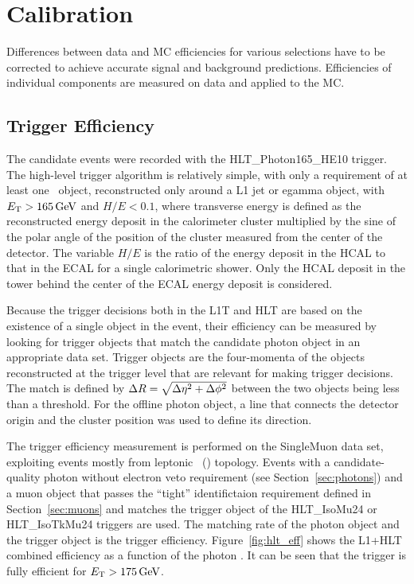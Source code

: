 \chapter{Calibration}
\label{chap:calibration}

Differences between data and MC efficiencies for various selections have to be corrected to achieve accurate signal and background predictions. 
Efficiencies of individual components are measured on data and applied to the MC.

\section{Trigger Efficiency}
\label{sec:triggereff}



The candidate events were recorded with the HLT\_Photon165\_HE10 trigger.
The high-level trigger algorithm is relatively simple, with only a requirement of at least one \egamma\ object, reconstructed only around a L1 jet or egamma object, with $E_{\mathrm{T}} > 165\,\text{Ge\hspace{-.08em}V}$ and $H/E < 0.1$, where transverse energy \ET is defined as the reconstructed energy deposit in the calorimeter cluster multiplied by the sine of the polar angle of the position of the cluster measured from the center of the detector. 
The variable $H/E$ is the ratio of the energy deposit in the HCAL to that in the ECAL for a single calorimetric shower. 
Only the HCAL deposit in the tower behind the center of the ECAL energy deposit is considered.

Because the trigger decisions both in the L1T and HLT are based on the existence of a single object in the event, their efficiency can be measured by looking for trigger objects that match the candidate photon object in an appropriate data set. 
Trigger objects are the four-momenta of the objects reconstructed at the trigger level that are relevant for making trigger decisions. 
The match is defined by $\Delta R = \sqrt{\Delta \eta^2 + \Delta \phi^2}$ between the two objects being less than a threshold. 
For the offline photon object, a line that connects the detector origin and the cluster position was used to define its direction.

The trigger efficiency measurement is performed on the SingleMuon data set, exploiting events mostly from leptonic \ttbar\ (\Pe\Pgm) topology. 
Events with a candidate-quality photon without electron veto requirement (see Section~\ref{sec:photons}) and a muon object that passes the ``tight''
identifictaion requirement defined in Section~\ref{sec:muons} and matches the trigger object of the HLT\_IsoMu24 or HLT\_IsoTkMu24 triggers are used. 
The matching rate of the photon object and the trigger object is the trigger efficiency. 
Figure~\ref{fig:hlt_eff} shows the L1+HLT combined efficiency as a function of the photon \ET. 
It can be seen that the trigger is fully efficient for $E_{\mathrm{T}} > 175\,\text{Ge\hspace{-.08em}V}$.

